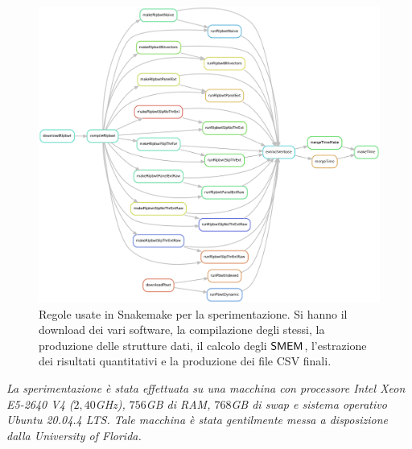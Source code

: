\begin{figure}
  \centering
  \includegraphics[width=\textwidth]{img/final_dag_r.pdf}
  \vspace{-5mm}
  \caption{Regole usate in Snakemake per la sperimentazione. Si hanno
  il download  dei vari software, la compilazione degli stessi, la produzione
  delle strutture dati,
  il calcolo degli $\mbox{\rm {\sf SMEM}}$, l'estrazione dei risultati
  quantitativi e la produzione dei file CSV finali.}
  \label{fig:snake}
\end{figure}
\newline
\textit{La sperimentazione è stata effettuata su una macchina con processore
  Intel Xeon E5-2640 V4 ($2,40$GHz), $756$GB di RAM, $768$GB di swap e
  sistema operativo Ubuntu 20.04.4 LTS. Tale macchina è stata gentilmente messa
  a disposizione dalla \emph{University of Florida}.}